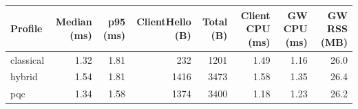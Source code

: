 \begin{tabular}{lrrrrrrr}
\toprule
Profile & Median (ms) & p95 (ms) & ClientHello (B) & Total (B) & Client CPU (ms) & GW CPU (ms) & GW RSS (MB)\\
\midrule
classical & 1.32 & 1.81 & 232 & 1201 & 1.49 & 1.16 & 26.0\\
hybrid & 1.54 & 1.81 & 1416 & 3473 & 1.58 & 1.35 & 26.4\\
pqc & 1.34 & 1.58 & 1374 & 3400 & 1.18 & 1.23 & 26.2\\
\bottomrule
\end{tabular}
